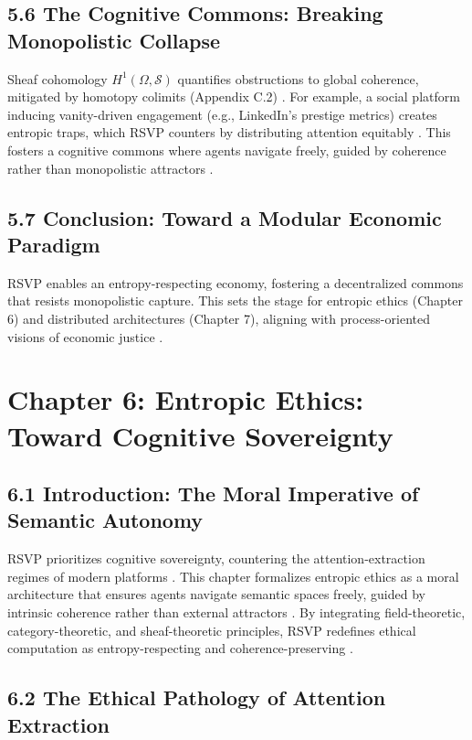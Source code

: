 \documentclass[12pt]{article}
\begin{document}
\subsection*{5.6 The Cognitive Commons: Breaking Monopolistic Collapse}

Sheaf cohomology \(H^1(\Omega, \mathcal{S})\) quantifies obstructions to global coherence, mitigated by homotopy colimits (Appendix C.2) \citep{hatcher2002}. For example, a social platform inducing vanity-driven engagement (e.g., LinkedIn’s prestige metrics) creates entropic traps, which RSVP counters by distributing attention equitably \citep{lanier2018}. This fosters a cognitive commons where agents navigate freely, guided by coherence rather than monopolistic attractors \citep{ortega1957}.

\subsection*{5.7 Conclusion: Toward a Modular Economic Paradigm}

RSVP enables an entropy-respecting economy, fostering a decentralized commons that resists monopolistic capture. This sets the stage for entropic ethics (Chapter 6) and distributed architectures (Chapter 7), aligning with process-oriented visions of economic justice \citep{whitehead1978, deleuze1987}.

\section*{Chapter 6: Entropic Ethics: Toward Cognitive Sovereignty}

\subsection*{6.1 Introduction: The Moral Imperative of Semantic Autonomy}

RSVP prioritizes cognitive sovereignty, countering the attention-extraction regimes of modern platforms \citep{zuboff2019, lanier2018}. This chapter formalizes entropic ethics as a moral architecture that ensures agents navigate semantic spaces freely, guided by intrinsic coherence rather than external attractors \citep{ortega1957}. By integrating field-theoretic, category-theoretic, and sheaf-theoretic principles, RSVP redefines ethical computation as entropy-respecting and coherence-preserving \citep{whitehead1978}.

\subsection*{6.2 The Ethical Pathology of Attention Extraction}
\end{document}
